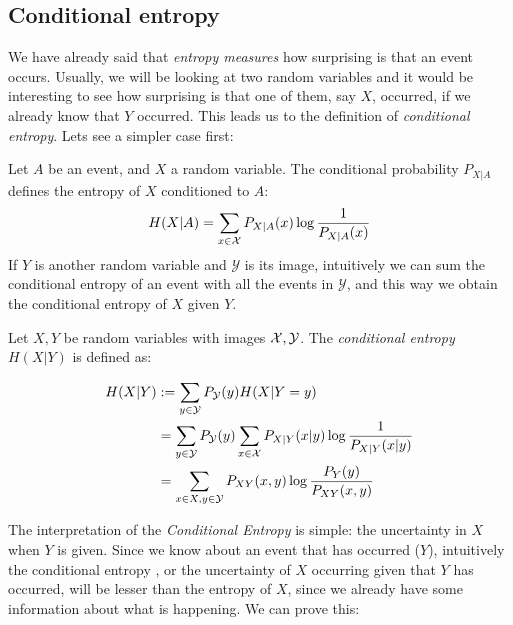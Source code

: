 \subsection*{Conditional entropy}
We have already said that \emph{entropy measures} how surprising is that an event occurs. Usually, we will be looking at two random variables and it would be interesting to see how surprising is that one of them, say $X$, occurred, if we already know that $Y$ occurred. This leads us to the definition of \emph{conditional entropy}. Lets see a simpler case first:

Let $A$ be an event, and $X$ a random variable. The conditional probability $P_{X|A}$ defines the entropy of $X$ conditioned to $ A$:
$$
H(X| A) = \sum_{x \in \mathcal{X}} P_{X|A}(x) \log\frac{1}{P_{X|A}(x)}
$$
If $Y$ is another random variable and $\mathcal Y$ is its image, intuitively we can sum the conditional entropy of an event with all the events in $\mathcal Y$, and this way we obtain the conditional entropy of $X$ given $Y$.
\begin{ndef}
Let $X,Y$ be random variables with images $\mathcal{X},\mathcal Y$. The \emph{conditional entropy} $H(X | Y)$ is defined as:

\begin{equation*}
        \begin{split}
    H(X|Y) &  :=   \sum_{y \in \mathcal Y} P_{\mathcal Y}(y) H(X| Y = y)  \\ 
    & = \sum_{y \in \mathcal Y} P_{\mathcal  Y}(y) \sum_{x \in \mathcal{X}} P_{X | Y}(x|y)\log\frac{1}{P_{X|Y}(x|y)}  \\
   & = \sum_{x \in X,y \in \mathcal Y}P_{XY}(x,y)\log\frac{P_Y(y)}{P_{XY}(x,y)}
\end{split}
\end{equation*}



\end{ndef}

The interpretation of the \emph{Conditional Entropy} is simple: the uncertainty in $X$ when $Y$ is given. Since we know about an event that has occurred ($Y$), intuitively the conditional entropy , or the uncertainty of $X$ occurring given that $Y$ has occurred, will be lesser than the entropy of $X$, since we already have some information about what is happening. We can prove this:

